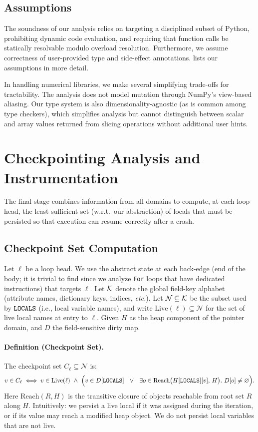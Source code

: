 \subsection{Assumptions}
The soundness of our analysis relies on targeting a disciplined subset of Python, prohibiting dynamic code evaluation, and requiring that function calls be statically resolvable modulo overload resolution. Furthermore, we assume correctness of user-provided type and side-effect annotations.  lists our assumptions in more detail.

In handling numerical libraries, we make several simplifying trade-offs for tractability. The analysis does not model mutation through NumPy's view-based aliasing. Our type system is also dimensionality-agnostic (as is common among type checkers), which simplifies analysis but cannot distinguish between scalar and array values returned from slicing operations without additional user hints.

\section{Checkpointing Analysis and Instrumentation}
\label{sec:checkpoint-analysis}

The final stage combines information from all domains to compute, at each loop head, the least sufficient set (w.r.t.\ our abstraction) of locals that must be persisted so that execution can resume correctly after a crash.

\subsection{Checkpoint Set Computation}

Let $\ell$ be a loop head. We use the abstract state at each back-edge (end of the body; it is trivial to find since we analyze \lstinline{For} loops that have dedicated instructions) that targets $\ell$.
Let $\mathcal{K}$ denote the global field-key alphabet (attribute names, dictionary keys, indices, \emph{etc.}).
Let $\mathcal{N}\subseteq\mathcal{K}$ be the subset used by $\texttt{LOCALS}$ (i.e., local variable names), and write $\text{Live}(\ell)\subseteq\mathcal{N}$ for the set of live local names at entry to $\ell$.
Given $H$ as the heap component of the pointer domain, and $D$ the field-sensitive dirty map.

\paragraph{Definition (Checkpoint Set).}
The checkpoint set $C_\ell\subseteq\mathcal{N}$ is:
\[
v\in C_\ell \iff v\in \text{Live}(\ell)\ \wedge\
\Big( v\in D[\texttt{LOCALS}] \ \ \lor\ \ \exists o\in \text{Reach}\big(H[\texttt{LOCALS}][v],\,H\big).\ D[o]\neq\varnothing \Big).
\]
Here $\text{Reach}(R,H)$ is the transitive closure of objects reachable from root set $R$ along $H$.
Intuitively: we persist a live local if it was assigned during the iteration, or if its value may reach a modified heap object. We do not persist local variables that are not live.


